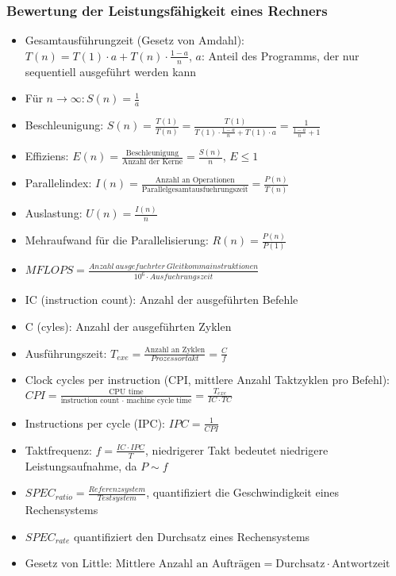 \subsubsection{Bewertung der Leistungsfähigkeit eines Rechners}
\begin{itemize}
	\item Gesamtausführungzeit (Gesetz von Amdahl): \(T(n) = T(1) \cdot a + T(n) \cdot \frac{1-a}{n}\), \(a\): Anteil des Programms, der nur sequentiell ausgeführt werden kann
	\item Für \(n \rightarrow \infty:S(n)=\frac{1}{a}\)
	\item Beschleunigung: \(S(n) = \frac{T(1)}{T(n)} = \frac{T(1)}{T(1) \cdot \frac{1-a}{n}+T(1) \cdot a} = \frac{1}{\frac{1-a}{n}+1}\)
	\item Effiziens: \(E(n) = \frac{\text{Beschleunigung}}{\text{Anzahl der Kerne}} = \frac{S(n)}{n}\), \(E \le 1\)
	\item Parallelindex: \(I(n) = \frac{\text{Anzahl an Operationen}}{\text{Parallelgesamtausfuehrungszeit}} = \frac{P(n)}{T(n)}\)
	\item Auslastung: \(U(n) = \frac{I(n)}{n}\)
	\item Mehraufwand für die Parallelisierung: \(R(n) = \frac{P(n)}{P(1)}\)
	\item \(MFLOPS = \frac{Anzahl~ausgefuehrter~Gleitkommainstruktionen}{10^6 \cdot Ausfuehrungszeit}\)
	\item IC (instruction count): Anzahl der ausgeführten Befehle
	\item C (cyles): Anzahl der ausgeführten Zyklen
	\item Ausführungszeit: \(T_{exe} = \frac{\text{Anzahl an Zyklen}}{Prozessortakt} = \frac{C}{f}\)
	\item Clock cycles per instruction (CPI, mittlere Anzahl Taktzyklen pro Befehl): \(CPI = \frac{\text{CPU time}}{\text{instruction count } \cdot \text{ machine cycle time}} = \frac{T_{exe}}{IC \cdot TC}\)
	\item Instructions per cycle (IPC): \(IPC = \frac{1}{CPI}\)
	\item Taktfrequenz: \(f = \frac{IC \cdot IPC}{T}\), niedrigerer Takt bedeutet niedrigere Leistungsaufnahme, da \(P \sim f\)
	\item \(SPEC_{ratio} = \frac{Referenzsystem}{Testsystem}\), quantifiziert die Geschwindigkeit eines Rechensystems
	\item \(SPEC_{rate}\) quantifiziert den Durchsatz eines Rechensystems
	\item Gesetz von Little: \(\text{Mittlere Anzahl an Aufträgen} = \text{Durchsatz} \cdot \text{Antwortzeit}\)
\end{itemize}

